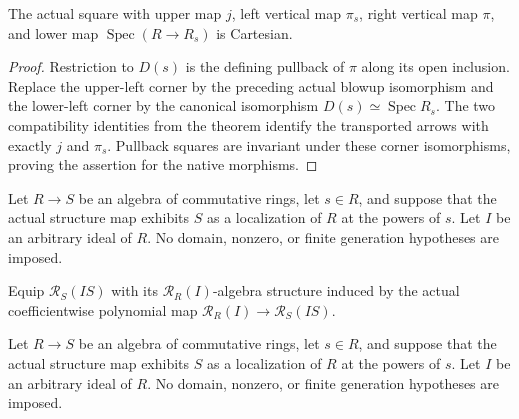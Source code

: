 \begin{corollary}\label{cor:affine-blowup-localization-pullback}
\leanok
The actual square with upper map $j$, left vertical map $\pi_s$, right
vertical map $\pi$, and lower map $\operatorname{Spec}(R\to R_s)$ is Cartesian.
\end{corollary}
\begin{proof}
Restriction to $D(s)$ is the defining pullback of $\pi$ along its open
inclusion. Replace the upper-left corner by the preceding actual blowup
isomorphism and the lower-left corner by the canonical isomorphism
$D(s)\simeq\operatorname{Spec}R_s$. The two compatibility identities from
the theorem identify the transported arrows with exactly $j$ and $\pi_s$.
Pullback squares are invariant under these corner isomorphisms, proving
the assertion for the native morphisms.
\end{proof}

\endgroup

\begingroup

Let $R\to S$ be an algebra of commutative rings, let $s\in R$,
and suppose that the actual structure map exhibits $S$ as a
localization of $R$ at the powers of $s$. Let $I$ be an
arbitrary ideal of $R$. No domain, nonzero, or finite generation
hypotheses are imposed.

\begin{definition}
\label{def:rees-coefficient-localization-algebra}
\leanok
Equip $\mathcal R_S(IS)$ with its $\mathcal R_R(I)$-algebra
structure induced by the actual coefficientwise polynomial map
$\mathcal R_R(I)\to\mathcal R_S(IS)$.
\end{definition}

\endgroup

\begingroup

Let $R\to S$ be an algebra of commutative rings, let $s\in R$,
and suppose that the actual structure map exhibits $S$ as a
localization of $R$ at the powers of $s$. Let $I$ be an
arbitrary ideal of $R$. No domain, nonzero, or finite generation
hypotheses are imposed.

